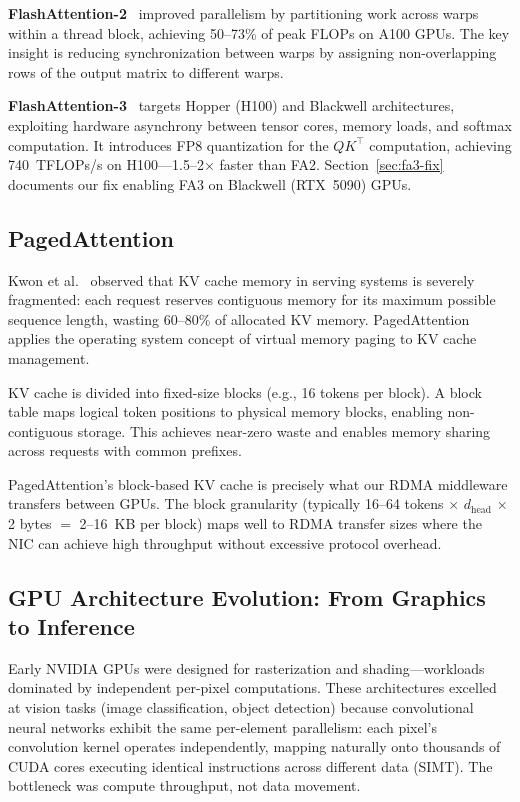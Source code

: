 \documentclass[11pt,letterpaper]{article}
\theoremstyle{definition}
\begin{document}
\textbf{FlashAttention-2}~\cite{dao2023flashattention2} improved parallelism by partitioning work across warps within a thread block, achieving 50--73\% of peak FLOPs on A100 GPUs. The key insight is reducing synchronization between warps by assigning non-overlapping rows of the output matrix to different warps.

\textbf{FlashAttention-3}~\cite{shah2024flashattention3} targets Hopper (H100) and Blackwell architectures, exploiting hardware asynchrony between tensor cores, memory loads, and softmax computation. It introduces FP8 quantization for the $QK^\top$ computation, achieving 740~TFLOPs/s on H100---1.5--2$\times$ faster than FA2. Section~\ref{sec:fa3-fix} documents our fix enabling FA3 on Blackwell (RTX~5090) GPUs.

\subsection{PagedAttention}

Kwon et al.~\cite{kwon2023pagedattention} observed that KV cache memory in serving systems is severely fragmented: each request reserves contiguous memory for its maximum possible sequence length, wasting 60--80\% of allocated KV memory. PagedAttention applies the operating system concept of virtual memory paging to KV cache management.

KV cache is divided into fixed-size blocks (e.g., 16 tokens per block). A block table maps logical token positions to physical memory blocks, enabling non-contiguous storage. This achieves near-zero waste and enables memory sharing across requests with common prefixes.

PagedAttention's block-based KV cache is precisely what our RDMA middleware transfers between GPUs. The block granularity (typically 16--64 tokens $\times$ $d_{\text{head}}$ $\times$ 2 bytes $=$ 2--16~KB per block) maps well to RDMA transfer sizes where the NIC can achieve high throughput without excessive protocol overhead.

\subsection{GPU Architecture Evolution: From Graphics to Inference}
\label{sec:tensor-core-evolution}

Early NVIDIA GPUs were designed for rasterization and shading---workloads dominated by independent per-pixel computations. These architectures excelled at vision tasks (image classification, object detection) because convolutional neural networks exhibit the same per-element parallelism: each pixel's convolution kernel operates independently, mapping naturally onto thousands of CUDA cores executing identical instructions across different data (SIMT). The bottleneck was compute throughput, not data movement.
\end{document}
